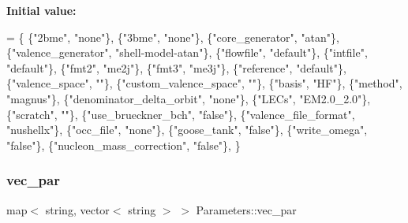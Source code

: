 {\bfseries Initial value\+:}
\begin{DoxyCode}
= \{
  \{\textcolor{stringliteral}{"2bme"},          \textcolor{stringliteral}{"none"}\},
  \{\textcolor{stringliteral}{"3bme"},          \textcolor{stringliteral}{"none"}\},
  \{\textcolor{stringliteral}{"core\_generator"},        \textcolor{stringliteral}{"atan"}\},    
  \{\textcolor{stringliteral}{"valence\_generator"},     \textcolor{stringliteral}{"shell-model-atan"}\},    
  \{\textcolor{stringliteral}{"flowfile"},          \textcolor{stringliteral}{"default"}\}, 
  \{\textcolor{stringliteral}{"intfile"},           \textcolor{stringliteral}{"default"}\}, 
  \{\textcolor{stringliteral}{"fmt2"},          \textcolor{stringliteral}{"me2j"}\},    
  \{\textcolor{stringliteral}{"fmt3"},          \textcolor{stringliteral}{"me3j"}\},    
  \{\textcolor{stringliteral}{"reference"},         \textcolor{stringliteral}{"default"}\}, 
  \{\textcolor{stringliteral}{"valence\_space"},     \textcolor{stringliteral}{""}\},        
  \{\textcolor{stringliteral}{"custom\_valence\_space"},      \textcolor{stringliteral}{""}\},        
  \{\textcolor{stringliteral}{"basis"},         \textcolor{stringliteral}{"HF"}\},      
  \{\textcolor{stringliteral}{"method"},            \textcolor{stringliteral}{"magnus"}\},  
  \{\textcolor{stringliteral}{"denominator\_delta\_orbit"},   \textcolor{stringliteral}{"none"}\},    
  \{\textcolor{stringliteral}{"LECs"},          \textcolor{stringliteral}{"EM2.0\_2.0"}\},   
  \{\textcolor{stringliteral}{"scratch"},           \textcolor{stringliteral}{""}\},        
  \{\textcolor{stringliteral}{"use\_brueckner\_bch"},          \textcolor{stringliteral}{"false"}\},  
  \{\textcolor{stringliteral}{"valence\_file\_format"},       \textcolor{stringliteral}{"nushellx"}\},    
  \{\textcolor{stringliteral}{"occ\_file"},          \textcolor{stringliteral}{"none"}\},    
  \{\textcolor{stringliteral}{"goose\_tank"},        \textcolor{stringliteral}{"false"}\},   
  \{\textcolor{stringliteral}{"write\_omega"},       \textcolor{stringliteral}{"false"}\},   
  \{\textcolor{stringliteral}{"nucleon\_mass\_correction"},   \textcolor{stringliteral}{"false"}\},   
\}
\end{DoxyCode}
\mbox{\label{classParameters_a793ffbac0c3bd5d1d9991ac2a5a7fb66}} 
\subsubsection{\texorpdfstring{vec\+\_\+par}{vec\_par}}
{\footnotesize\ttfamily map$<$ string, vector$<$ string $>$ $>$ Parameters\+::vec\+\_\+par\hspace{0.3cm}{\ttfamily [static]}}


